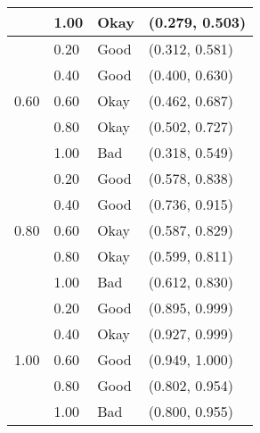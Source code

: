\documentclass[12pt]{article}
\begin{document}
{\begin{tabular}{|l|l|l|l|}
            & \cellcolor{Yellow}1.00 & \cellcolor{Yellow}Okay &
              \cellcolor{Yellow}(0.279, 0.503) \\
        \hline
        \multirow{5}{*}{0.60}
            & \cellcolor{Yellow}0.20 & \cellcolor{Yellow}Good &
              \cellcolor{Yellow}(0.312, 0.581) \\
            & \cellcolor{Green}0.40 & \cellcolor{Green}Good &
              \cellcolor{Green}(0.400, 0.630) \\
            & \cellcolor{Yellow}0.60 & \cellcolor{Yellow}Okay &
              \cellcolor{Yellow}(0.462, 0.687) \\
            & \cellcolor{Yellow}0.80 & \cellcolor{Yellow}Okay &
              \cellcolor{Yellow}(0.502, 0.727) \\
            & \cellcolor{Red}1.00 & \cellcolor{Red}Bad &
              \cellcolor{Red}(0.318, 0.549) \\
        \hline
        \multirow{5}{*}{0.80}
            & \cellcolor{Green}0.20 & \cellcolor{Green}Good &
              \cellcolor{Green}(0.578, 0.838) \\
            & \cellcolor{Green}0.40 & \cellcolor{Green}Good &
              \cellcolor{Green}(0.736, 0.915) \\
            & \cellcolor{Yellow}0.60 & \cellcolor{Yellow}Okay &
              \cellcolor{Yellow}(0.587, 0.829) \\
            & \cellcolor{Yellow}0.80 & \cellcolor{Yellow}Okay &
              \cellcolor{Yellow}(0.599, 0.811) \\
            & \cellcolor{Red}1.00 & \cellcolor{Red}Bad &
              \cellcolor{Red}(0.612, 0.830) \\
        \hline
        \multirow{5}{*}{1.00}
            & \cellcolor{Yellow}0.20 & \cellcolor{Yellow}Good &
              \cellcolor{Yellow}(0.895, 0.999) \\
            & \cellcolor{Yellow}0.40 & \cellcolor{Yellow}Okay &
              \cellcolor{Yellow}(0.927, 0.999) \\
            & \cellcolor{Green}0.60 & \cellcolor{Green}Good &
              \cellcolor{Green}(0.949, 1.000) \\
            & \cellcolor{Yellow}0.80 & \cellcolor{Yellow}Good &
              \cellcolor{Yellow}(0.802, 0.954) \\
            & \cellcolor{Red}1.00 & \cellcolor{Red}Bad &
              \cellcolor{Red}(0.800, 0.955) \\
        \hline
    \end{tabular}}
\end{document}
